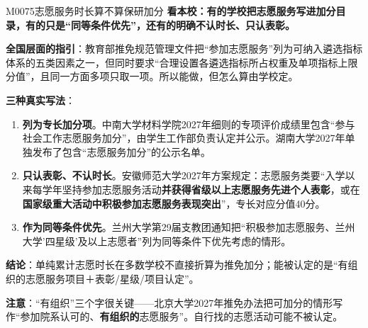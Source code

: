 \begin{qa}{M0075}{志愿服务时长算不算保研加分}
\textbf{看本校：有的学校把志愿服务写进加分目录，有的只是“同等条件优先”，还有的明确不认时长、只认表彰。}

\textbf{全国层面的指引}：教育部推免规范管理文件把“参加志愿服务”列为可纳入遴选指标体系的五类因素之一，但同时要求“合理设置各遴选指标所占权重及单项指标上限分值”，且同一方面多项只取一项。所以能做，但怎么算由学校定。

\textbf{三种真实写法}：

\begin{enumerate}
  \item \textbf{列为专长加分项}。中南大学材料学院2027年细则的专项评价成绩里包含“参与社会工作志愿服务加分”，由学生工作部负责认定并公示。湖南大学2027年单独发布了包含“志愿服务加分”的公示名单。
  \item \textbf{只认表彰、不认时长}。安徽师范大学2027年方案规定：志愿服务类要“入学以来每学年坚持参加志愿服务活动\textbf{并获得省级以上志愿服务先进个人表彰}，或在\textbf{国家级重大活动中积极参加志愿服务表现突出}”，专长对应分值40分。
  \item \textbf{作为同等条件优先}。兰州大学第29届支教团通知把“积极参加志愿服务、兰州大学'四星级'及以上志愿者”列为同等条件下优先考虑的情形。
\end{enumerate}

\textbf{结论}：单纯累计志愿时长在多数学校不直接折算为推免加分；能被认定的是“有组织的志愿服务项目＋表彰/星级/项目认定”。

\textbf{注意}：“有组织”三个字很关键——北京大学2027年推免办法把可加分的情形写作“参加院系认可的、\textbf{有组织的}志愿服务”。自行找的志愿活动可能不被认定。
\end{qa}

